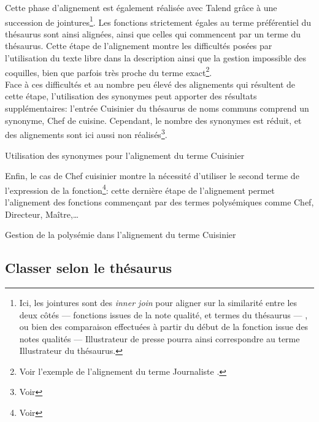 Cette phase d'alignement est également réalisée avec Talend grâce à une succession de jointures\footnote{Ici, les jointures sont des \textit{inner join} pour aligner sur la similarité entre les deux côtés --- fonctions issues de la note qualité, et termes du thésaurus --- , ou bien des comparaison effectuées à partir du début de la fonction issue des notes qualités --- \og Illustrateur de presse\fg{} pourra ainsi correspondre au terme \og Illustrateur\fg{} du thésaurus.}. Les fonctions strictement égales au terme préférentiel du thésaurus sont ainsi alignées, ainsi que celles qui commencent par un terme du thésaurus. Cette étape de l'alignement montre les difficultés posées par l'utilisation du texte libre dans la description ainsi que la gestion impossible des coquilles, bien que parfois très proche du terme exact\footnote{Voir l'exemple de l'alignement du terme \og Journaliste\fg{} .}.\\

Face à ces difficultés et au nombre peu élevé des alignements qui résultent de cette étape, l'utilisation des synonymes peut apporter des résultats supplémentaires: l'entrée \og Cuisinier\fg{} du thésaurus de noms communs comprend un synonyme, \og Chef de cuisine\fg{}. Cependant, le nombre des synonymes est réduit, et des alignements sont ici aussi non réalisés\footnote{Voir }.
\begin{table}[!h]
	\centering
	\caption{Utilisation des synonymes pour l'alignement du terme \og Cuisinier\fg{}}
	\label{alignement_cuisinier}
\end{table}

Enfin, le cas de \og Chef cuisinier\fg{} montre la nécessité d'utiliser le second terme de l'expression de la fonction\footnote{Voir }: cette dernière étape de l'alignement permet l'alignement des fonctions commençant par des termes polysémiques comme \og Chef\fg{}, \og Directeur\fg{}, \og Maître\fg{},\dots
\begin{table}[!h]
	\centering
	\caption{Gestion de la polysémie dans l'alignement du terme \og Cuisinier\fg{}}
	\label{alignement_cuisinier_polysemie}
\end{table}

\subsection{\label{I-C-3-c}Classer selon le thésaurus}

